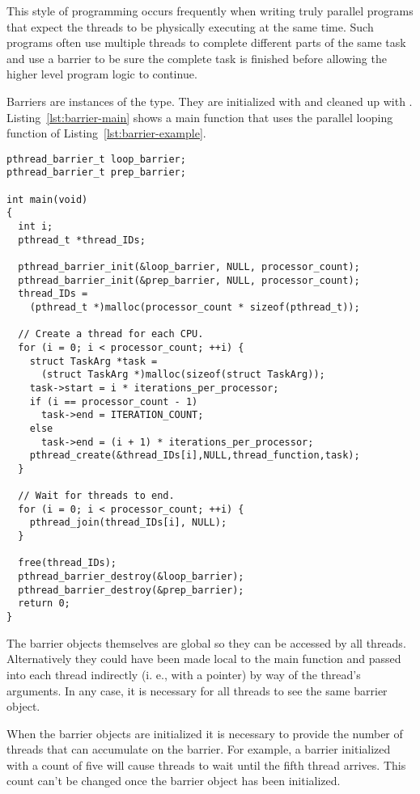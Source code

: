 This style of programming occurs frequently when writing truly parallel programs that expect the
threads to be physically executing at the same time. Such programs often use multiple threads to
complete different parts of the same task and use a barrier to be sure the complete task is
finished before allowing the higher level program logic to continue.

Barriers are instances of the  type. They are initialized with
 and cleaned up with .
Listing~\ref{lst:barrier-main} shows a main function that uses the parallel looping function of
Listing~\ref{lst:barrier-example}.

\begin{lstlisting}[float=tp,frame=single,xleftmargin=0in, caption={Barrier
Example Main},label=lst:barrier-main]
pthread_barrier_t loop_barrier;
pthread_barrier_t prep_barrier;

int main(void)
{
  int i;
  pthread_t *thread_IDs;

  pthread_barrier_init(&loop_barrier, NULL, processor_count);
  pthread_barrier_init(&prep_barrier, NULL, processor_count);
  thread_IDs =
    (pthread_t *)malloc(processor_count * sizeof(pthread_t));

  // Create a thread for each CPU.
  for (i = 0; i < processor_count; ++i) {
    struct TaskArg *task =
      (struct TaskArg *)malloc(sizeof(struct TaskArg));
    task->start = i * iterations_per_processor;
    if (i == processor_count - 1)
      task->end = ITERATION_COUNT;
    else
      task->end = (i + 1) * iterations_per_processor;
    pthread_create(&thread_IDs[i],NULL,thread_function,task);
  }

  // Wait for threads to end.
  for (i = 0; i < processor_count; ++i) {
    pthread_join(thread_IDs[i], NULL);
  }

  free(thread_IDs);
  pthread_barrier_destroy(&loop_barrier);
  pthread_barrier_destroy(&prep_barrier);
  return 0;
}
\end{lstlisting}

The barrier objects themselves are global so they can be accessed by all threads. Alternatively
they could have been made local to the main function and passed into each thread indirectly (i.
e., with a pointer) by way of the thread's arguments. In any case, it is necessary for all
threads to see the same barrier object.

When the barrier objects are initialized it is necessary to provide the number of threads that
can accumulate on the barrier. For example, a barrier initialized with a count of five will
cause threads to wait until the fifth thread arrives. This count can't be changed once the
barrier object has been initialized.

